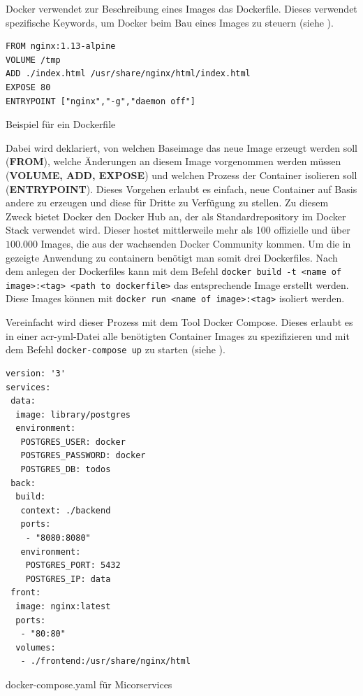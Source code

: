 Docker verwendet zur Beschreibung eines Images das Dockerfile. Dieses verwendet spezifische Keywords, um Docker beim Bau eines Images zu steuern (siehe ).

\begin{listing}[h]
	\begin{verbatim}
FROM nginx:1.13-alpine
VOLUME /tmp
ADD ./index.html /usr/share/nginx/html/index.html
EXPOSE 80
ENTRYPOINT ["nginx","-g","daemon off"]
	\end{verbatim}
	\caption{Beispiel für ein Dockerfile}
	\label{lst:dockerfileExmpl}
\end{listing}

Dabei wird deklariert, von welchen Baseimage das neue Image erzeugt werden soll (\textbf{FROM}), welche Änderungen an diesem Image vorgenommen werden müssen (\textbf{VOLUME, ADD, EXPOSE}) und welchen Prozess der Container isolieren soll (\textbf{ENTRYPOINT}). Dieses Vorgehen erlaubt es einfach, neue Container auf Basis andere zu erzeugen und diese für Dritte zu Verfügung zu stellen. Zu diesem Zweck bietet Docker den Docker Hub an, der als Standardrepository im Docker Stack verwendet wird. Dieser hostet mittlerweile mehr als 100 offizielle und über $100.000$ Images, die aus der wachsenden Docker Community kommen. Um die in  gezeigte Anwendung zu containern benötigt man somit drei Dockerfiles. Nach dem anlegen der Dockerfiles kann mit dem Befehl \texttt{docker build -t <name of image>:<tag> <path to dockerfile>} das entsprechende Image erstellt werden. Diese Images können mit \texttt{docker run <name of image>:<tag>} isoliert werden.

Vereinfacht wird dieser Prozess mit dem Tool Docker Compose. Dieses erlaubt es in einer \gls{acr-yml}-Datei alle benötigten Container Images zu spezifizieren und mit dem Befehl \texttt{docker-compose up} zu starten (siehe ).

\begin{listing}[h]
	\begin{verbatim}
version: '3'
services:
 data:
  image: library/postgres
  environment:
   POSTGRES_USER: docker
   POSTGRES_PASSWORD: docker
   POSTGRES_DB: todos
 back:
  build:
   context: ./backend
   ports:
    - "8080:8080"
   environment:
    POSTGRES_PORT: 5432
    POSTGRES_IP: data
 front:
  image: nginx:latest
  ports:
   - "80:80"
  volumes:
   - ./frontend:/usr/share/nginx/html
	\end{verbatim}
	\caption{docker-compose.yaml für Micorservices}
	\label{lst:dockerComposeTodos}
\end{listing}

